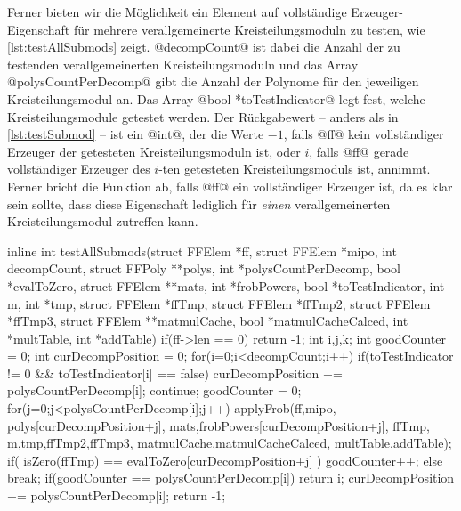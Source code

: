 Ferner bieten wir die Möglichkeit ein Element auf vollständige
Erzeuger-Eigenschaft für mehrere verallgemeinerte Kreisteilungsmoduln zu
testen, wie \autoref{lst:testAllSubmods} zeigt. @decompCount@ ist dabei die
Anzahl der zu testenden verallgemeinerten Kreisteilungsmoduln und das Array
\newline
@polysCountPerDecomp@ gibt die Anzahl der Polynome für den jeweiligen
Kreisteilungsmodul an. Das Array @bool *toTestIndicator@ legt fest, welche
Kreisteilungsmodule getestet werden. Der Rückgabewert -- anders als in 
\autoref{lst:testSubmod} -- ist ein @int@, der die Werte $-1$, falls @ff@ kein
vollständiger Erzeuger der getesteten Kreisteilungsmoduln ist, oder $i$, falls
@ff@ gerade vollständiger Erzeuger des $i$-ten getesteten Kreisteilungsmoduls
ist, annimmt. Ferner bricht die Funktion ab, falls @ff@ ein vollständiger
Erzeuger ist, da es klar sein sollte, dass diese Eigenschaft lediglich für
\emph{einen} verallgemeinerten Kreisteilungsmodul zutreffen kann.

\begin{ccode}[caption={[\texttt{int testAllSubmods} aus 
 \url{../Sage/enumeratePCNs.c}]Aus \url{../Sage/enumeratePCNs.c}},
  label=lst:testAllSubmods]
inline int testAllSubmods(struct FFElem *ff, struct FFElem *mipo, 
        int decompCount, struct FFPoly **polys,
        int *polysCountPerDecomp, bool *evalToZero, 
        struct FFElem **mats, int *frobPowers, bool *toTestIndicator,
        int m, int *tmp, 
        struct FFElem *ffTmp, struct FFElem *ffTmp2, struct FFElem *ffTmp3,
        struct FFElem **matmulCache, bool *matmulCacheCalced,
        int *multTable, int *addTable){
    if(ff->len == 0) return -1;
    int i,j,k;
    int goodCounter = 0;
    int curDecompPosition = 0;
    for(i=0;i<decompCount;i++){
        if(toTestIndicator != 0 && toTestIndicator[i] == false){
            curDecompPosition += polysCountPerDecomp[i];
            continue;
        }
        goodCounter = 0;
        for(j=0;j<polysCountPerDecomp[i];j++){
            applyFrob(ff,mipo,
                    polys[curDecompPosition+j],
                    mats,frobPowers[curDecompPosition+j], ffTmp,
                    m,tmp,ffTmp2,ffTmp3,
                    matmulCache,matmulCacheCalced,
                    multTable,addTable);
            if( isZero(ffTmp) == evalToZero[curDecompPosition+j] ){
                goodCounter++;
            }else break;
        }
        if(goodCounter == polysCountPerDecomp[i]){
            return i;
        }
        curDecompPosition += polysCountPerDecomp[i];
    }
    return -1;
}
\end{ccode}


